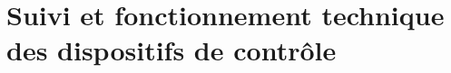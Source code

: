 \documentclass[11pt,twoside]{article}\usepackage[]{graphicx}\usepackage[table]{xcolor}
\begin{document}
% 
% 
% 

\section{Suivi et fonctionnement technique des dispositifs de contrôle}
\end{document}
